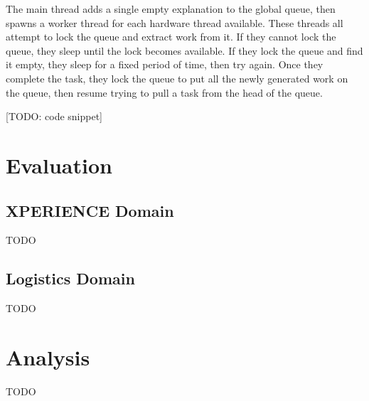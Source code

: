 \documentclass[12pt,twoside,abbrevs,msc,ai,notimes,logo,sansheadings]{infthesis}
\begin{document}
  The main thread adds a single empty explanation to the global queue, then spawns a worker thread for each hardware thread available. These threads all attempt to lock the queue and extract work from it. If they cannot lock the queue, they sleep until the lock becomes available. If they lock the queue and find it empty, they sleep for a fixed period of time, then try again. Once they complete the task, they lock the queue to put all the newly generated work on the queue, then resume trying to pull a task from the head of the queue.
  
  [TODO: code snippet]
  
  \section{Evaluation}
  \subsection{XPERIENCE Domain}
  TODO
  \subsection{Logistics Domain}
  TODO
  \section{Analysis}
  TODO
  
   
  
  
  
  

  \appendix


  {}
  
\end{document}
